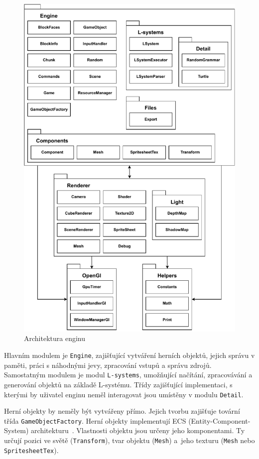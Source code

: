 \documentclass[thesis=M,czech]{FITthesis}[2019/12/23]
\begin{document}
\begin{figure}\centering
	\includegraphics[width=\textwidth]{images/architecture2}
	\caption[Architektura enginu]{Architektura enginu}\label{fig:architecture}
\end{figure}

Hlavním modulem je \texttt{Engine}, zajišťující vytváření herních objektů, jejich správu v paměti, práci s náhodnými jevy, zpracování vstupů a správu zdrojů. Samostatným modulem je modul \texttt{L-systems}, umožňující načítání, zpracovávání a generování objektů na základě L-systému. Třídy zajišťující implementaci, s kterými by uživatel enginu neměl interagovat jsou umístěny v modulu \texttt{Detail}.

Herní objekty by neměly být vytvářeny přímo. Jejich tvorbu zajišťuje tovární třída \texttt{GameObjectFactory}. Herní objekty implementují ECS (Entity-Component-System) architekturu~\cite{ecs}. Vlastnosti objektu jsou určeny jeho komponentami. Ty určují pozici ve světě (\texttt{Transform}), tvar objektu (\texttt{Mesh}) a~jeho texturu (\texttt{Mesh} nebo \texttt{SpritesheetTex}).
\end{document}
